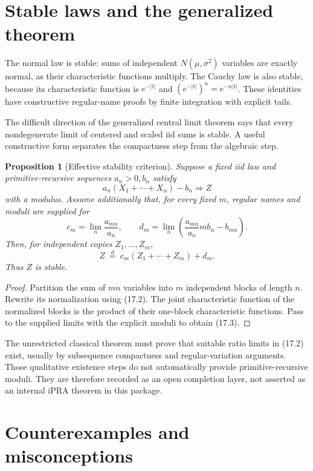\documentclass[11pt]{article}
\newtheorem{proposition}[theorem]{Proposition}
\newcommand{\ipra}{\mathrm{iPRA}}
\begin{document}
\section{Stable laws and the generalized theorem}
\label{sec:stable}

The normal law is stable: sums of independent
\(N(\mu,\sigma^2)\) variables are exactly normal, as their characteristic
functions multiply.  The Cauchy law is also stable, because its characteristic
function is \(e^{-|t|}\) and
\((e^{-|t|})^n=e^{-n|t|}\).  These identities have constructive regular-name
proofs by finite integration with explicit tails.

The difficult direction of the generalized central limit theorem says that
every nondegenerate limit of centered and scaled iid sums is stable.  A useful
constructive form separates the compactness step from the algebraic step.

\begin{proposition}[Effective stability criterion]
Suppose a fixed iid law and primitive-recursive sequences \(a_n>0,b_n\)
satisfy
\[
 a_n(X_1+\cdots+X_n)-b_n\Longrightarrow Z            \tag{17.1}
\]
with a modulus.  Assume additionally that, for every fixed \(m\), regular
names and moduli are supplied for
\[
 c_m=\lim_n\frac{a_{mn}}{a_n},
 \qquad
 d_m=\lim_n\left(\frac{a_{mn}}{a_n}m b_n-b_{mn}\right).                \tag{17.2}
\]
Then, for independent copies \(Z_1,\ldots,Z_m\),
\[
 Z\ \stackrel d=\ c_m(Z_1+\cdots+Z_m)+d_m.            \tag{17.3}
\]
Thus \(Z\) is stable.
\end{proposition}

\begin{proof}
Partition the sum of \(mn\) variables into \(m\) independent blocks of
length \(n\).  Rewrite its normalization using (17.2).  The joint
characteristic function of the normalized blocks is the product of their
one-block characteristic functions.  Pass to the supplied limits with the
explicit moduli to obtain (17.3).
\end{proof}

The unrestricted classical theorem must prove that suitable ratio limits in
(17.2) exist, usually by subsequence compactness and regular-variation
arguments.  Those qualitative existence steps do not automatically provide
primitive-recursive moduli.  They are therefore recorded as an open
completion layer, not asserted as an internal \(\ipra\) theorem in this
package.

\section{Counterexamples and misconceptions}
\label{sec:counterexamples}
\end{document}

